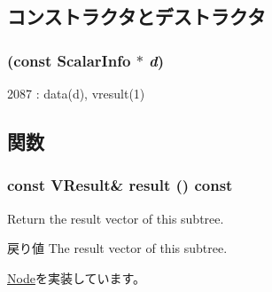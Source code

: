 \subsection{コンストラクタとデストラクタ}
\hypertarget{classStats_1_1ScalarStatNode_aba24d0ae5b7375423d6e04e1e1277bc6}{
\subsubsection[{ScalarStatNode}]{ (const {\bf ScalarInfo} $\ast$ {\em d})}}
\label{classStats_1_1ScalarStatNode_aba24d0ae5b7375423d6e04e1e1277bc6}



\begin{DoxyCode}
2087 : data(d), vresult(1) {}
\end{DoxyCode}


\subsection{関数}
\hypertarget{classStats_1_1ScalarStatNode_aba312f9e3431b1652f8b3ddf3fe105dc}{
\subsubsection[{result}]{\setlength{\rightskip}{0pt plus 5cm}const {\bf VResult}\& result () const}}
\label{classStats_1_1ScalarStatNode_aba312f9e3431b1652f8b3ddf3fe105dc}
Return the result vector of this subtree. \begin{DoxyReturn}{戻り値}
The result vector of this subtree. 
\end{DoxyReturn}


\hyperlink{classStats_1_1Node_a7fcf57115122663db42f39cc18ca0f62}{Node}を実装しています。


